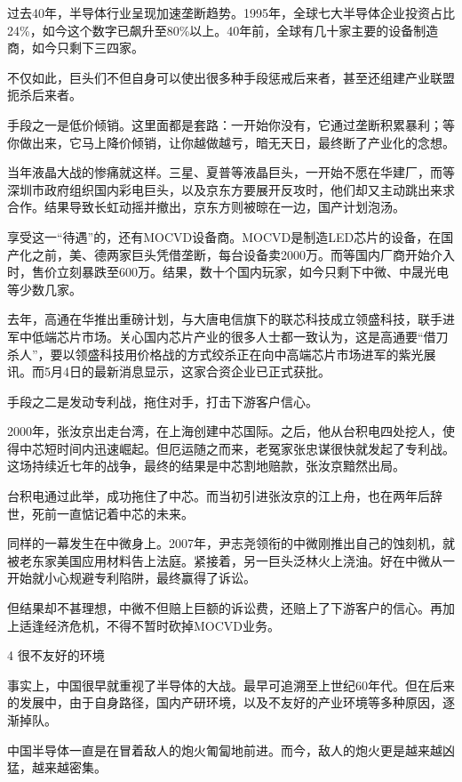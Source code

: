 \documentclass[utf8]{book}
\begin{document}
	过去40年，半导体行业呈现加速垄断趋势。1995年，全球七大半导体企业投资占比24\%，如今这个数字已飙升至80\%以上。40年前，全球有几十家主要的设备制造商，如今只剩下三四家。

	不仅如此，巨头们不但自身可以使出很多种手段惩戒后来者，甚至还组建产业联盟扼杀后来者。

	手段之一是低价倾销。这里面都是套路：一开始你没有，它通过垄断积累暴利；等你做出来，它马上降价倾销，让你越做越亏，暗无天日，最终断了产业化的念想。

	当年液晶大战的惨痛就这样。三星、夏普等液晶巨头，一开始不愿在华建厂，而等深圳市政府组织国内彩电巨头，以及京东方要展开反攻时，他们却又主动跳出来求合作。结果导致长虹动摇并撤出，京东方则被晾在一边，国产计划泡汤。

	享受这一“待遇”的，还有MOCVD设备商。MOCVD是制造LED芯片的设备，在国产化之前，美、德两家巨头凭借垄断，每台设备卖2000万。而等国内厂商开始介入时，售价立刻暴跌至600万。结果，数十个国内玩家，如今只剩下中微、中晟光电等少数几家。

	去年，高通在华推出重磅计划，与大唐电信旗下的联芯科技成立领盛科技，联手进军中低端芯片市场。关心国内芯片产业的很多人士都一致认为，这是高通要“借刀杀人”，要以领盛科技用价格战的方式绞杀正在向中高端芯片市场进军的紫光展讯。而5月4日的最新消息显示，这家合资企业已正式获批。

	手段之二是发动专利战，拖住对手，打击下游客户信心。

	2000年，张汝京出走台湾，在上海创建中芯国际。之后，他从台积电四处挖人，使得中芯短时间内迅速崛起。但厄运随之而来，老冤家张忠谋很快就发起了专利战。这场持续近七年的战争，最终的结果是中芯割地赔款，张汝京黯然出局。

	台积电通过此举，成功拖住了中芯。而当初引进张汝京的江上舟，也在两年后辞世，死前一直惦记着中芯的未来。

	同样的一幕发生在中微身上。2007年，尹志尧领衔的中微刚推出自己的蚀刻机，就被老东家美国应用材料告上法庭。紧接着，另一巨头泛林火上浇油。好在中微从一开始就小心规避专利陷阱，最终赢得了诉讼。

	但结果却不甚理想，中微不但赔上巨额的诉讼费，还赔上了下游客户的信心。再加上适逢经济危机，不得不暂时砍掉MOCVD业务。

	\begin{flushleft}
		{\Large 4 很不友好的环境}
	\end{flushleft}


	事实上，中国很早就重视了半导体的大战。最早可追溯至上世纪60年代。但在后来的发展中，由于自身路径，国内产研环境，以及不友好的产业环境等多种原因，逐渐掉队。

	中国半导体一直是在冒着敌人的炮火匍匐地前进。而今，敌人的炮火更是越来越凶猛，越来越密集。
\end{document}
